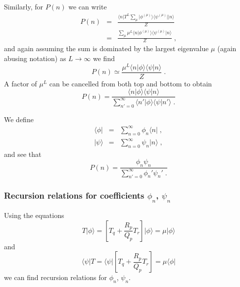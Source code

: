\documentclass[a4paper,10pt]{article}
\newcommand{\bra}[1]{\langle #1 \vert}
\newcommand{\ket}[1]{\vert #1 \rangle}
\newcommand{\braket}[2]{\langle #1 \vert #2 \rangle}
\begin{document}
Similarly, for $P(n)$ we can write
\begin{eqnarray}
 P(n) &=&  \frac{
                 \bra{n} T^L \sum_{\mu} \ket{\phi^{(\mu)}}\bra{\psi^{(\mu)}} \ket{n}
                 }{Z} \nonumber \\
      &=& \frac{
                 \sum_{\mu} \mu^L\braket{n}{\phi^{(\mu)}}\braket{\psi^{(\mu)}}{n}
                 }{Z}  \;, 
\end{eqnarray}
and again assuming the sum is dominated by the largest eigenvalue $\mu$ (again abusing notation) as $L\to\infty$ we find
\begin{equation}
 P(n) \simeq \frac{
                   \mu^L \braket{n}{\phi}\braket{\psi}{n}
                  }
                  {Z} \;. 
\end{equation}
A factor of $\mu^L$ can be cancelled from both top and bottom to obtain
\begin{equation}
  P(n) = \frac{ 
               \braket{n}{\phi}\braket{\psi}{n}
              }
              {
               \sum_{n'=0}^\infty \braket{n'}{\phi}\braket{\psi}{n'} \;. 
              }
\end{equation}

We define
\begin{eqnarray}
 \bra{\phi} &=& \sum_{n=0}^\infty \phi_n \bra{n} \;, \nonumber \\
 \ket{\psi} &=& \sum_{n=0}^\infty \psi_n \ket{n} \;,
\end{eqnarray}
and see that
\begin{equation}
  P(n) = \frac{ 
               \phi_n\psi_n
              }
              {
               \sum_{n'=0}^\infty \phi_n' \psi_n' \;. 
              }
\end{equation}



\subsubsection{Recursion relations for coefficients $\phi_n$, $\psi_n$}

Using the equations
\begin{equation}
 T\ket{\phi} = \left[ T_q + \frac{R_p}{Q_p} T_r \right] \ket{\phi} = \mu \ket{\phi}
\end{equation}
and
\begin{equation}
 \bra{\psi}T = \bra{\psi}\left[ T_q + \frac{R_p}{Q_p} T_r \right]= \mu \bra{\phi}
\end{equation}
we can find recursion relations for $\phi_n$, $\psi_n$. 
\end{document}
